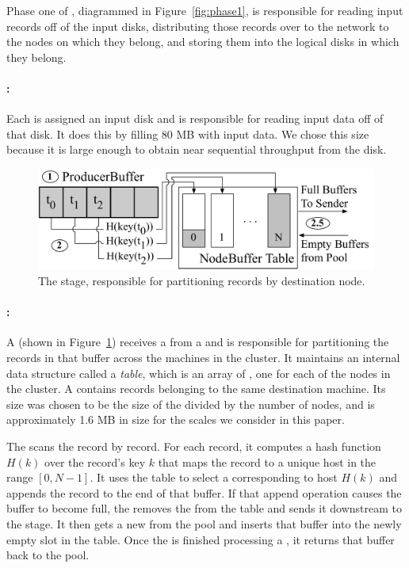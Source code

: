 Phase one of \tritonsort, diagrammed in Figure~\ref{fig:phase1}, is responsible
for reading input records off of the input disks, distributing those records
over to the network to the nodes on which they belong, and storing them into
the logical disks in which they belong.

\paragraph{\reader:} Each \reader is assigned an input disk and
is responsible for reading input data off of that disk.  It does this by
filling 80 MB \producerbuffers with input data.
We chose this size because it is large
enough to obtain near sequential throughput from the disk.

\begin{figure}
  \centering
  \includegraphics[width=\columnwidth]{tritonsort/figs/pnts_stage.pdf}
  \caption{The \pnts stage, responsible for partitioning records by
    destination node.}
  \label{fig:pnts}
\end{figure}

\paragraph{\pnts:} A \pnts (shown in Figure~\ref{fig:pnts}) receives a
\producerbuffer from a \reader and is responsible for partitioning the records
in that buffer across the machines in the cluster.  It maintains an internal
data structure called a \emph{\nodebuffer table}, which is an array of
\nodebuffers, one for each of the nodes in the cluster.  A \nodebuffer contains
records belonging to the same destination machine.  Its size was chosen to be
the size of the \producerbuffer divided by the number of nodes, and is
approximately 1.6 MB in size for the scales we consider in this paper.

The \pnts scans the \producerbuffer record by record.  For each record, it
computes a hash function $H(k)$ over the record's key $k$ that maps the record to
a unique host in the range $[0,N-1]$.  It uses the \nodebuffer table to select
a \nodebuffer corresponding to host $H(k)$ and appends the record to the end of
that buffer.  If that append operation causes the buffer to become full, the
\pnts removes the \nodebuffer from the \nodebuffer table and sends it
downstream to the \sender stage.  It then gets a new \nodebuffer from the
\nodebuffer pool and inserts that buffer into the newly empty slot in the
\nodebuffer table.  Once the \pnts is finished processing a
\producerbuffer, it returns that buffer back to the \producerbuffer pool.

